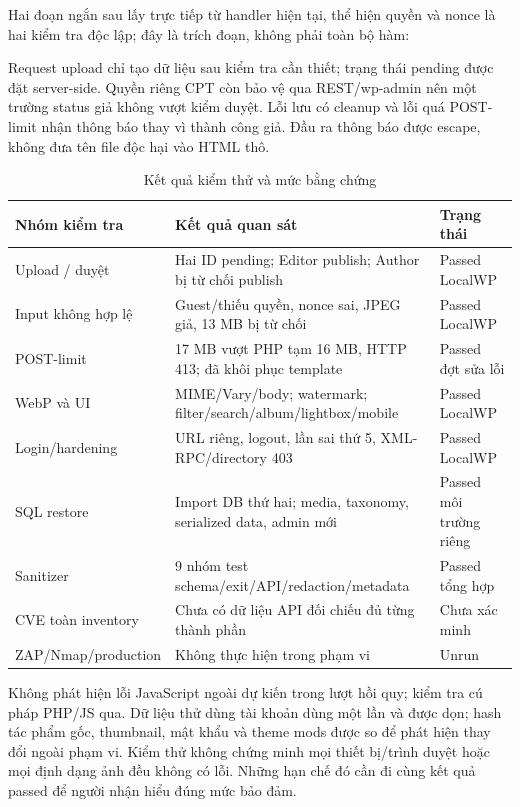 Hai đoạn ngắn sau lấy trực tiếp từ handler hiện tại, thể hiện quyền và nonce là hai kiểm tra độc lập; đây là trích đoạn, không phải toàn bộ hàm:

Request upload chỉ tạo dữ liệu sau kiểm tra cần thiết; trạng thái pending được đặt server-side. Quyền riêng CPT còn bảo vệ qua REST/wp-admin nên một trường status giả không vượt kiểm duyệt. Lỗi lưu có cleanup và lỗi quá POST-limit nhận thông báo thay vì thành công giả. Đầu ra thông báo được escape, không đưa tên file độc hại vào HTML thô.

\begin{table}[H]\centering\small
\caption{Kết quả kiểm thử và mức bằng chứng}
\begin{tabularx}{\linewidth}{YYl}\toprule Nhóm kiểm tra & Kết quả quan sát & Trạng thái\\\midrule
Upload / duyệt & Hai ID pending; Editor publish; Author bị từ chối publish & Passed LocalWP\\
Input không hợp lệ & Guest/thiếu quyền, nonce sai, JPEG giả, 13 MB bị từ chối & Passed LocalWP\\
POST-limit & 17 MB vượt PHP tạm 16 MB, HTTP 413; đã khôi phục template & Passed đợt sửa lỗi\\
WebP và UI & MIME/Vary/body; watermark; filter/search/album/lightbox/mobile & Passed LocalWP\\
Login/hardening & URL riêng, logout, lần sai thứ 5, XML-RPC/directory 403 & Passed LocalWP\\
SQL restore & Import DB thứ hai; media, taxonomy, serialized data, admin mới & Passed môi trường riêng\\
Sanitizer & 9 nhóm test schema/exit/API/redaction/metadata & Passed tổng hợp\\
CVE toàn inventory & Chưa có dữ liệu API đối chiếu đủ từng thành phần & Chưa xác minh\\
ZAP/Nmap/production & Không thực hiện trong phạm vi & Unrun\\\bottomrule\end{tabularx}
\end{table}

Không phát hiện lỗi JavaScript ngoài dự kiến trong lượt hồi quy; kiểm tra cú pháp PHP/JS qua. Dữ liệu thử dùng tài khoản dùng một lần và được dọn; hash tác phẩm gốc, thumbnail, mật khẩu và theme mods được so để phát hiện thay đổi ngoài phạm vi. Kiểm thử không chứng minh mọi thiết bị/trình duyệt hoặc mọi định dạng ảnh đều không có lỗi. Những hạn chế đó cần đi cùng kết quả passed để người nhận hiểu đúng mức bảo đảm.
